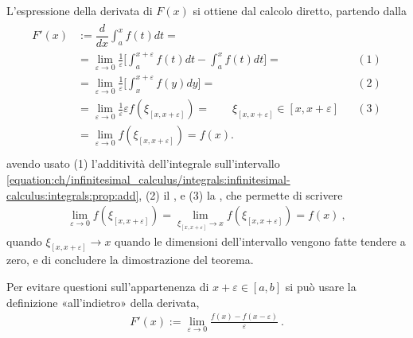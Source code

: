 \documentclass[letterpaper,10pt,italian]{jupyterBook}
\begin{document}
\sphinxAtStartPar
{} L’espressione della derivata di \(F(x)\) si ottiene dal calcolo diretto, partendo dalla {\hyperref[\detokenize{ch/infinitesimal_calculus/derivatives:infinitesimal-calculus-derivatives-def}]{}}
\begin{equation*}
\begin{split}\begin{aligned}
F'(x)
  & := \dfrac{d}{dx} \int_{a}^x f(t) dt = \\
  & = \lim_{\varepsilon \rightarrow 0 } \frac{1}{\varepsilon} \Big[ \int_{a}^{x+\varepsilon} f(t) dt - \int_{a}^{x} f(t) dt \Big] = && (1) \\
  & = \lim_{\varepsilon \rightarrow 0 } \frac{1}{\varepsilon} \Big[ \int_{x}^{x+\varepsilon} f(y) dy \Big] = && (2) \\
  & = \lim_{\varepsilon \rightarrow 0 } \frac{1}{\varepsilon} \varepsilon f(\xi_{[x,x+\varepsilon]}) = \qquad \xi_{[x,x+\varepsilon]} \in [x,x+\varepsilon] && (3) \\
  & = \lim_{\varepsilon \rightarrow 0 } f(\xi_{[x,x+\varepsilon]}) = f(x) . \\
\end{aligned}\end{split}
\end{equation*}
\sphinxAtStartPar
avendo usato (1) l’additività dell’integrale sull’intervallo \eqref{equation:ch/infinitesimal_calculus/integrals:infinitesimal-calculus:integrals:prop:add}, (2) il {\hyperref[\detokenize{ch/infinitesimal_calculus/integrals:infinitesimal-calculus-integrals-thm-avg}]{}}, e (3) la {\hyperref[\detokenize{ch/infinitesimal_calculus/analysis:infinitesimal-calculus-continuous-fun-def}]{}}, che permette di scrivere
\begin{equation*}
\begin{split}\lim_{\varepsilon \rightarrow 0} f(\xi_{[x,x+\varepsilon]}) = \lim_{\xi_{[x,x+\varepsilon]} \rightarrow x} f(\xi_{[x,x+\varepsilon]}) =  f(x) \ ,\end{split}
\end{equation*}
\sphinxAtStartPar
quando \(\xi_{[x,x+\varepsilon]} \rightarrow x\) quando le dimensioni dell’intervallo vengono fatte tendere a zero, e di concludere la dimostrazione del teorema.

\sphinxAtStartPar
{} Per evitare questioni sull’appartenenza di \(x + \varepsilon \in [a,b]\) si può usare la definizione «all’indietro» della derivata,
\begin{equation*}
\begin{split}F'(x) := \lim_{\varepsilon \rightarrow 0} \frac{f(x) - f(x-\varepsilon)}{\varepsilon} \ . \end{split}
\end{equation*}
\end{document}
